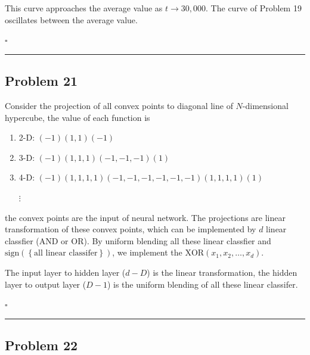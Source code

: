 \documentclass[12pt]{article}
\newcommand*{\QEDB}{\hfill\ensuremath{\square}}
\newcommand{\CBrackets}[1]{\left\{#1\right\}}
\newcommand{\ParTh}[1]{\left(#1\right)}
\newcommand{\horrule}[1]{\rule{\linewidth}{#1}}
\begin{document}
This curve approaches the average value as $t\rightarrow30,000$. The curve of Problem 19 oscillates between the average value.

\QEDB

\horrule{0.5pt}

\subsection*{Problem 21}

Consider the projection of all convex points to diagonal line of $N$-dimensional hypercube, the value of each function is
\begin{enumerate}
	\item 2-D: $\ParTh{-1}\ParTh{1,1}\ParTh{-1}$
	\item 3-D: $\ParTh{-1}\ParTh{1,1,1}\ParTh{-1,-1,-1}\ParTh{1}$
	\item 4-D: $\ParTh{-1}\ParTh{1,1,1,1}\ParTh{-1,-1,-1,-1,-1,-1}\ParTh{1,1,1,1}\ParTh{1}$
	\item[$\vdots$]
\end{enumerate}
the convex points are the input of neural network. The projections are linear transformation of these convex points, which can be implemented by $d$ linear classfier (AND or OR). By uniform blending all these linear classfier and $\text{sign}\ParTh{\CBrackets{\text{all linear classifer}}}$, we implement the $\text{XOR}\ParTh{x_1,x_2,\ldots,x_d}$.

The input layer to hidden layer ($d-D$) is the linear transformation, the hidden layer to output layer ($D-1$) is the uniform blending of all these linear classifer.

\QEDB

\horrule{0.5pt}

\subsection*{Problem 22}
\end{document}
